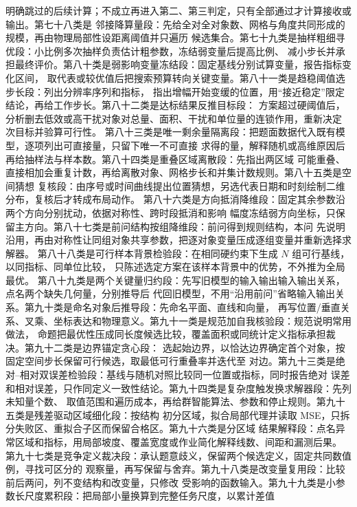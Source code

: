 明确跳过的后续计算；不成立再进入第二、第三判定，只有全部通过才计算接收或输出。第七十八类是
邻接降算量段：先给全对全对象数、网格与角度共同形成的规模，再由物理局部性设距离阈值并只遍历
候选集合。第七十九类是抽样粗细寻优段：小比例多次抽样负责估计粗参数，冻结弱变量后提高比例、
减小步长并承担最终评价。第八十类是弱影响变量冻结段：固定基线分别试算变量，报告指标变化区间，
取代表或较优值后把搜索预算转向关键变量。第八十一类是趋稳阈值选步长段：列出分辨率序列和指标，
指出增幅开始变缓的位置，用“接近稳定”限定结论，再给工作步长。第八十二类是达标结果反推目标段：
方案超过硬阈值后，分析删去低效或高干扰对象对总量、面积、干扰和单位量的连锁作用，重新决定
次目标并验算可行性。
第八十三类是唯一剩余量隔离段：把题面数据代入既有模型，逐项列出可直接量，只留下唯一不可直接
求得的量，解释随机或高维原因后再给抽样法与样本数。第八十四类是重叠区域离散段：先指出两区域
可能重叠、直接相加会重复计数，再给离散对象、网格步长和并集计数规则。第八十五类是空间猜想
复核段：由序号或时间曲线提出位置猜想，另选代表日期和时刻绘制二维分布，复核后才转成布局动作。
第八十六类是方向抵消降维段：固定其余参数沿两个方向分别扰动，依据对称性、跨时段抵消和影响
幅度冻结弱方向坐标，只保留主方向。第八十七类是前问结构按组降维段：前问得到规则结构，本问
先说明沿用，再由对称性让同组对象共享参数，把逐对象变量压成逐组变量并重新选择求解器。
第八十八类是可行样本背景检验段：在相同硬约束下生成 $N$ 组可行基线，以同指标、同单位比较，
只陈述选定方案在该样本背景中的优势，不外推为全局最优。
第八十九类是两个关键量归约段：先写旧模型的输入输出输入输出关系，点名两个缺失几何量，分别推导后
代回旧模型，不用“沿用前问”省略输入输出关系。第九十类是命名对象后推导段：先命名平面、直线和向量，
再写位置/垂直关系、叉乘、坐标表达和物理意义。第九十一类是规范加自我核验段：规范说明常用做法，
命题把最优性压成同长度候选比较，覆盖面积或同统计定义指标承担裁决。第九十二类是边界锚定贪心段：
选起始边界，以恰达边界确定首个对象，按固定空间步长保留可行候选，取最低可行重叠率并迭代至
对边。第九十三类是绝对--相对双误差检验段：基线与随机对照比较同一位置或指标，同时报告绝对
误差和相对误差，只作同定义一致性结论。第九十四类是复杂度触发换求解器段：先列未知量个数、
取值范围和遍历成本，再给群智能算法、参数和停止规则。第九十五类是残差驱动区域细化段：按结构
初分区域，拟合局部代理并读取 MSE，只拆分失败区、重拟合子区而保留合格区。第九十六类是分区域
结果解释段：点名异常区域和指标，用局部坡度、覆盖宽度或作业简化解释线数、间距和漏测后果。
第九十七类是竞争定义裁决段：承认题意歧义，保留两个候选定义，固定共同数值例，寻找可区分的
观察量，再写保留与舍弃。第九十八类是改变量复用段：比较前后两问，列不变结构和改变量，只修改
受影响的函数输入。第九十九类是小参数长尺度累积段：把局部小量换算到完整任务尺度，以累计差值
